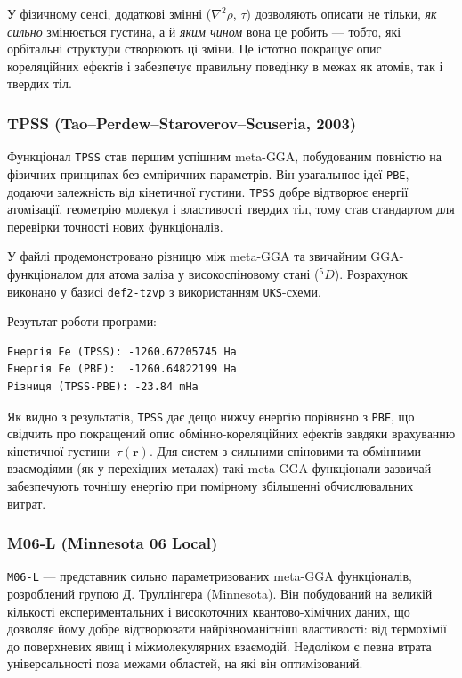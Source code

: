 У фізичному сенсі, додаткові змінні ($\nabla^2\rho$, $\tau$) дозволяють описати не тільки, \emph{як сильно} змінюється густина, а й \emph{яким чином} вона це робить --- тобто, які орбітальні структури створюють ці зміни.
Це істотно покращує опис кореляційних ефектів і забезпечує правильну поведінку в межах як атомів, так і твердих тіл.

\subsubsection{TPSS (Tao–Perdew–Staroverov–Scuseria, 2003)}

Функціонал \texttt{TPSS} став першим успішним meta-GGA, побудованим повністю на фізичних принципах без емпіричних параметрів.
Він узагальнює ідеї \texttt{PBE}, додаючи залежність від кінетичної густини.
\texttt{TPSS} добре відтворює енергії атомізації, геометрію молекул і властивості твердих тіл, тому став стандартом для перевірки точності нових функціоналів.

У файлі  продемонстровано різницю між meta-GGA та звичайним GGA-функціоналом для атома заліза у високоспіновому стані ($^5D$). Розрахунок виконано у базисі \texttt{def2-tzvp} з використанням \texttt{UKS}-схеми.

Резутьтат роботи програми:
\begin{verbatim}
Енергія Fe (TPSS): -1260.67205745 Ha
Енергія Fe (PBE):  -1260.64822199 Ha
Різниця (TPSS-PBE): -23.84 mHa
\end{verbatim}

Як видно з результатів, \texttt{TPSS} дає дещо нижчу енергію порівняно з \texttt{PBE}, що свідчить про покращений опис обмінно-кореляційних ефектів завдяки врахуванню кінетичної густини~$\tau(\mathbf{r})$. Для систем з сильними спіновими та обмінними взаємодіями (як у перехідних металах) такі meta-GGA-функціонали зазвичай забезпечують точнішу енергію при помірному збільшенні обчислювальних витрат.



\subsubsection{M06-L (Minnesota 06 Local)}

\texttt{M06-L} --- представник сильно параметризованих meta-GGA функціоналів, розроблений групою Д. Труллінгера (Minnesota).
Він побудований на великій кількості експериментальних і високоточних квантово-хімічних даних, що дозволяє йому добре відтворювати найрізноманітніші властивості: від термохімії до поверхневих явищ і міжмолекулярних взаємодій.
Недоліком є певна втрата універсальності поза межами областей, на які він оптимізований.

